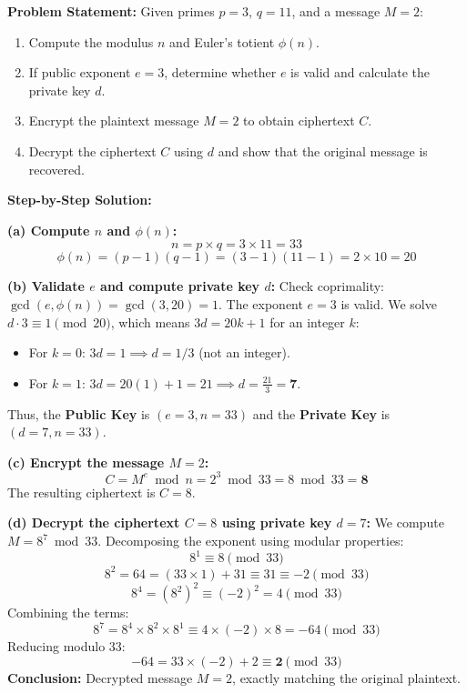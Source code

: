 \begin{tcolorbox}[colback=white,colframe=black,title=\textbf{Worked Examination Problem: Full RSA Execution}]
\textbf{Problem Statement:}
Given primes $p = 3$, $q = 11$, and a message $M = 2$:
\begin{enumerate}[label=(\alph*)]
\item Compute the modulus $n$ and Euler's totient $\phi(n)$.
\item If public exponent $e = 3$, determine whether $e$ is valid and calculate the private key $d$.
\item Encrypt the plaintext message $M = 2$ to obtain ciphertext $C$.
\item Decrypt the ciphertext $C$ using $d$ and show that the original message is recovered.
\end{enumerate}

\textbf{Step-by-Step Solution:}

\textbf{(a) Compute $n$ and $\phi(n)$:}
\[ n = p \times q = 3 \times 11 = 33 \]
\[ \phi(n) = (p - 1)(q - 1) = (3 - 1)(11 - 1) = 2 \times 10 = 20 \]

\textbf{(b) Validate $e$ and compute private key $d$:}
Check coprimality: $\gcd(e, \phi(n)) = \gcd(3, 20) = 1$. The exponent $e = 3$ is valid.
We solve $d \cdot 3 \equiv 1 \pmod{20}$, which means $3d = 20k + 1$ for an integer $k$:
\begin{itemize}
\item For $k = 0$: $3d = 1 \implies d = 1/3$ (not an integer).
\item For $k = 1$: $3d = 20(1) + 1 = 21 \implies d = \frac{21}{3} = \mathbf{7}$.
\end{itemize}
Thus, the \textbf{Public Key} is $(e = 3, n = 33)$ and the \textbf{Private Key} is $(d = 7, n = 33)$.

\textbf{(c) Encrypt the message $M = 2$:}
\[ C = M^e \bmod n = 2^3 \bmod 33 = 8 \bmod 33 = \mathbf{8} \]
The resulting ciphertext is $C = 8$.

\textbf{(d) Decrypt the ciphertext $C = 8$ using private key $d = 7$:}
We compute $M = 8^7 \bmod 33$. Decomposing the exponent using modular properties:
\[ 8^1 \equiv 8 \pmod{33} \]
\[ 8^2 = 64 = (33 \times 1) + 31 \equiv 31 \equiv -2 \pmod{33} \]
\[ 8^4 = (8^2)^2 \equiv (-2)^2 = 4 \pmod{33} \]
Combining the terms:
\[ 8^7 = 8^4 \times 8^2 \times 8^1 \equiv 4 \times (-2) \times 8 = -64 \pmod{33} \]
Reducing modulo 33:
\[ -64 = 33 \times (-2) + 2 \equiv \mathbf{2} \pmod{33} \]
\textbf{Conclusion:} Decrypted message $M = 2$, exactly matching the original plaintext.
\end{tcolorbox}

